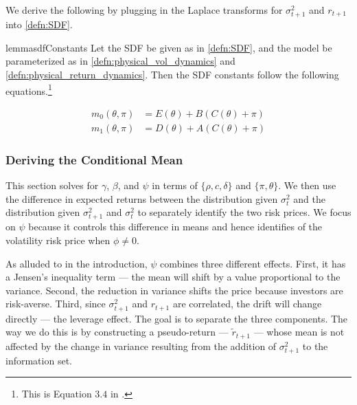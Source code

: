 \documentclass[11pt, letterpaper, twoside]{article}
\begin{document}
We derive the following by plugging in the Laplace transforms for $\sigma^2_{t+1}$ and $r_{t+1}$ into \cref{defn:SDF}.

\begin{restatable}{lemma}{sdfConstants}
    \label{lemma:characterizing_sdf_integration_constants}
    Let the SDF be given as in \cref{defn:SDF}, and the model be parameterized as in \cref{defn:physical_vol_dynamics} and \cref{defn:physical_return_dynamics}.  Then the SDF constants follow the following equations.\footnote{This is Equation $3.4$ in \textcite[3.4]{han2018leverage}.}
    
    \begin{align}
        \label{eqn:sdf_functions_vs_physical_functions}
        m_0(\theta, \pi) &= E(\theta) + B(C(\theta) + \pi) \\
        m_1(\theta, \pi) &= D(\theta) + A(C(\theta) + \pi) \nonumber
    \end{align}
    
\end{restatable}


\subsubsection{Deriving the Conditional Mean}\label{sec:deriving_conditional_mean}


This section solves for $\gamma$, $\beta$, and $\psi$ in terms of $\lbrace \rho, c, \delta \rbrace$ and $\lbrace \pi, \theta \rbrace$. We then use the difference in expected returns between the distribution given $\sigma^2_t$ and the distribution given $\sigma^2_{t+1}$ and $\sigma^2_t$ to separately identify the two risk prices. We focus on $\psi$ because it controls this difference in means and hence identifies of the volatility risk price when $\phi \neq 0$.

As alluded to in the introduction, $\psi$ combines three different effects. First, it has a Jensen's inequality term --- the mean will shift by a value proportional to the variance. Second, the reduction in variance shifts the price because investors are risk-averse. Third, since $\sigma^2_{t+1}$ and $r_{t+1}$ are correlated, the drift will change directly ---  the leverage effect. The goal is to separate the three components. The way we do this is by constructing a pseudo-return --- $\widetilde{r}_{t+1}$ --- whose mean is not affected by the change in variance resulting from the addition of $\sigma^2_{t+1}$ to the information set.
\end{document}
